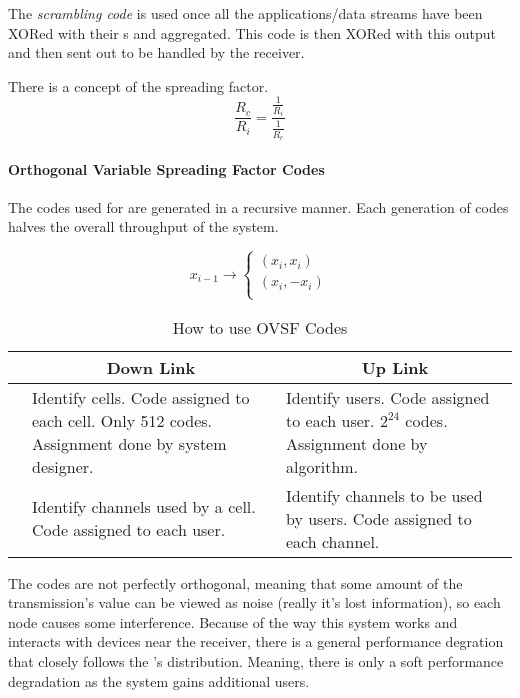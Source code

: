 \begin{definition}\label{def:Scrambling_Code}
  The \emph{scrambling code} is used once all the applications/data streams have been XORed with their s and aggregated.
  This code is then XORed with this output and then sent out to be handled by the receiver.
\end{definition}

There is a concept of the spreading factor.
\begin{equation}\label{eq:Spreading_Factor}
  \frac{R_{c}}{R_{i}} = \frac{\frac{1}{R_{i}}}{\frac{1}{R_{c}}}
\end{equation}

\paragraph{Orthogonal Variable Spreading Factor Codes}\label{par:OVSF_Codes}
The codes used for  are generated in a recursive manner.
Each generation of codes halves the overall throughput of the system.

\begin{equation}\label{eq:OVSF_Codes}
  x_{i-1} \rightarrow
  \begin{cases}
    (x_{i}, x_{i}) \\
    (x_{i}, -x_{i}) \\
  \end{cases}
\end{equation}

\begin{table}[h!]
  \centering
  \begin{tabular}{c|p{4cm}p{4cm}}
    \toprule
    & \multicolumn{1}{c}{Down Link} & \multicolumn{1}{c}{Up Link} \\
    \midrule
    \nameref{def:Scrambling_Code} & Identify cells. Code assigned to each cell. Only 512 codes. Assignment done by system designer. & Identify users. Code assigned to each user. $2^{24}$ codes. Assignment done by algorithm. \\
    \nameref{def:Spreading_Code} & Identify channels used by a cell. Code assigned to each user. & Identify channels to be used by users. Code assigned to each channel.
  \end{tabular}
  \caption{How to use OVSF Codes}
  \label{tab:Use_OVSF_Codes}
\end{table}

The codes are not perfectly orthogonal, meaning that some amount of the transmission's value can be viewed as noise (really it's lost information), so each node causes some interference.
Because of the way this system works and interacts with devices near the receiver, there is a general performance degration that closely follows the 's distribution.
Meaning, there is only a soft performance degradation as the system gains additional users.

